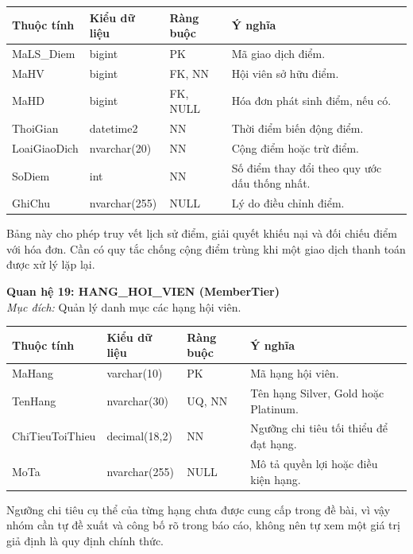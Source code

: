 \documentclass[11pt, a4paper]{article}
\begin{document}
\begin{small}
\begin{tabularx}{\textwidth}{| C{2.8cm} | C{2.4cm} | C{2.2cm} | Y |}
\hline
\textbf{Thuộc tính} & \textbf{Kiểu dữ liệu} & \textbf{Ràng buộc} & \textbf{Ý nghĩa} \\
\hline
MaLS\_Diem & bigint & PK & Mã giao dịch điểm. \\
\hline
MaHV & bigint & FK, NN & Hội viên sở hữu điểm. \\
\hline
MaHD & bigint & FK, NULL & Hóa đơn phát sinh điểm, nếu có. \\
\hline
ThoiGian & datetime2 & NN & Thời điểm biến động điểm. \\
\hline
LoaiGiaoDich & nvarchar(20) & NN & Cộng điểm hoặc trừ điểm. \\
\hline
SoDiem & int & NN & Số điểm thay đổi theo quy ước dấu thống nhất. \\
\hline
GhiChu & nvarchar(255) & NULL & Lý do điều chỉnh điểm. \\
\hline
\end{tabularx}
\end{small}

Bảng này cho phép truy vết lịch sử điểm, giải quyết khiếu nại và đối chiếu điểm với hóa đơn. Cần có quy tắc chống cộng điểm trùng khi một giao dịch thanh toán được xử lý lặp lại.

\vspace{0.8em}
\textbf{Quan hệ 19: HANG\_HOI\_VIEN (MemberTier)} \\
\textit{Mục đích:} Quản lý danh mục các hạng hội viên.

\begin{small}
\begin{tabularx}{\textwidth}{| C{3cm} | C{2.4cm} | C{2.2cm} | Y |}
\hline
\textbf{Thuộc tính} & \textbf{Kiểu dữ liệu} & \textbf{Ràng buộc} & \textbf{Ý nghĩa} \\
\hline
MaHang & varchar(10) & PK & Mã hạng hội viên. \\
\hline
TenHang & nvarchar(30) & UQ, NN & Tên hạng Silver, Gold hoặc Platinum. \\
\hline
ChiTieuToiThieu & decimal(18,2) & NN & Ngưỡng chi tiêu tối thiểu để đạt hạng. \\
\hline
MoTa & nvarchar(255) & NULL & Mô tả quyền lợi hoặc điều kiện hạng. \\
\hline
\end{tabularx}
\end{small}

Ngưỡng chi tiêu cụ thể của từng hạng chưa được cung cấp trong đề bài, vì vậy nhóm cần tự đề xuất và công bố rõ trong báo cáo, không nên tự xem một giá trị giả định là quy định chính thức.
\end{document}
